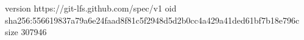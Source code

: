 version https://git-lfs.github.com/spec/v1
oid sha256:556619837a79a6e24faad8f81c5f2948d5d2b0cc4a429a41ded61bf7b18e796c
size 307946
